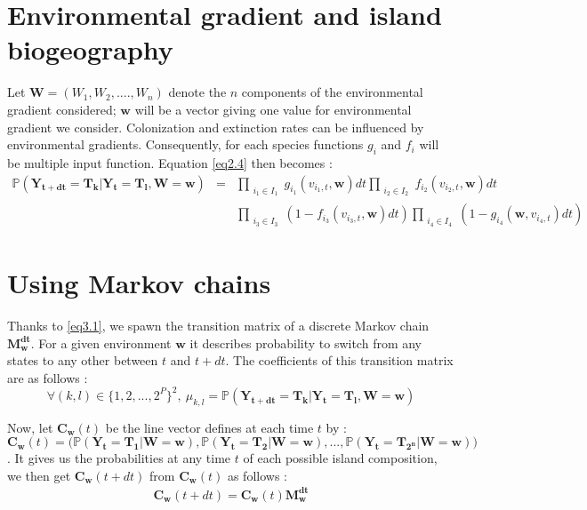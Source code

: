 \section{Environmental gradient and island biogeography}

Let $\mathbf{W}=(W_1, W_2, ...., W_n)$ denote the $n$ components of the environmental gradient considered; $\mathbf{w}$ will be a vector giving one value for environmental gradient we consider. Colonization and extinction rates can be influenced by environmental gradients. Consequently, for each species functions $g_i$ and $f_i$ will be multiple input function. Equation \eqref{eq2.4} then becomes :
\begin{eqnarray}
\nonumber \mathbb{P}(\mathbf{\mathbf{Y_{t+dt}}}=\mathbf{T_k}|\mathbf{\mathbf{Y_t}}=\mathbf{T_l}, \mathbf{W}=\mathbf{w})&=&\prod_{\substack{i_1\in I_1}}g_{i_1}(v_{i_1,t}, \mathbf{w})dt \prod_{\substack{i_2\in I_2}}f_{i_2}(v_{i_2,t}, \mathbf{w})dt \\ & & \prod_{\substack{i_3\in I_3}}(1-f_{i_3}(v_{i_3,t}, \mathbf{w})dt )\prod_{\substack{i_4\in I_4}}(1-g_{i_4}(\mathbf{w}, v_{i_4,t})dt)
\label{eq3.1}
\end{eqnarray}



\section{Using Markov chains}

Thanks to \eqref{eq3.1}, we spawn the transition matrix of a discrete Markov chain $\mathbf{M_w^{dt}}$. For a given environment $\mathbf{w}$ it describes probability to switch from any states to any other between $t$ and $t+dt$. The coefficients of this transition matrix are as follows :
\begin{equation}
\label{eq4.1} \forall (k,l)\in \{ 1,2,..., 2^P\}^2,~ \mu_{k,l}=\mathbb{P}(\mathbf{\mathbf{Y_{t+dt}}}=\mathbf{T_k}|\mathbf{\mathbf{Y_t}}=\mathbf{T_l}, \mathbf{W}=\mathbf{w})
\end{equation}

Now, let $\mathbf{C_w}(t)$ be the line vector defines at each time $t$ by : $\mathbf{C_w}(t)=\big(\mathbb{P}(\mathbf{\mathbf{Y_t}}=\mathbf{T_1}|\mathbf{W}=\mathbf{w}), \mathbb{P}(\mathbf{\mathbf{Y_t}}=\mathbf{T_2}|\mathbf{W}=\mathbf{w}),..., \mathbb{P}(\mathbf{\mathbf{Y_t}}=\mathbf{T_{2^n}}|\mathbf{W}=\mathbf{w})\big)$. It gives us the probabilities at any time $t$ of each possible island composition, we then get $\mathbf{C_w}(t+dt)$ from $\mathbf{C_w}(t)$ as follows :
\begin{eqnarray}
\label{eq4.2} \mathbf{C_w}(t+dt)=\mathbf{C_w}(t)\mathbf{M_w^{dt}}
\end{eqnarray}

